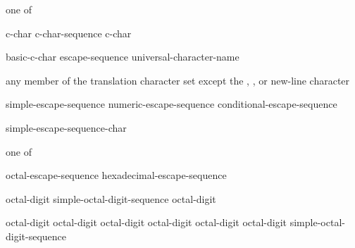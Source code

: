 \begin{bnf}
 \textnormal{one of}\br
    \quad{}\quad{}\quad{}
\end{bnf}

\begin{bnf}
\br
    c-char\br
    c-char-sequence c-char
\end{bnf}

\begin{bnf}
\br
    basic-c-char\br
    escape-sequence\br
    universal-character-name
\end{bnf}

\begin{bnf}
\br
    \textnormal{any member of the translation character set except the ,}\br
    \bnfindent\textnormal{, or new-line character}
\end{bnf}

\begin{bnf}
\br
    simple-escape-sequence\br
    numeric-escape-sequence\br
    conditional-escape-sequence
\end{bnf}

\begin{bnf}
\br
    \terminal{\textbackslash} simple-escape-sequence-char
\end{bnf}

\begin{bnf}
 \textnormal{one of}\br
\end{bnf}

\begin{bnf}
\br
    octal-escape-sequence\br
    hexadecimal-escape-sequence
\end{bnf}

\begin{bnf}
\br
    octal-digit\br
    simple-octal-digit-sequence octal-digit
\end{bnf}

\begin{bnf}
\br
    \literalterminal{\textbackslash} octal-digit\br
    \literalterminal{\textbackslash} octal-digit octal-digit\br
    \literalterminal{\textbackslash} octal-digit octal-digit octal-digit\br
     simple-octal-digit-sequence \literalterminal{\}}\br
\end{bnf}


